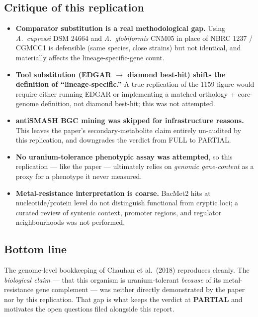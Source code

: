 \documentclass[11pt]{article}
\begin{document}
\subsection*{Critique of this replication}
\begin{itemize}
  \item \textbf{Comparator substitution is a real methodological gap.} Using \textit{A.\ cupressi} DSM 24664 and \textit{A.\ globiformis} CNM05 in place of NBRC 1237 / CGMCC1 is defensible (same species, close strains) but not identical, and materially affects the lineage-specific-gene count.
  \item \textbf{Tool substitution (EDGAR $\rightarrow$ diamond best-hit) shifts the definition of ``lineage-specific.''} A true replication of the 1159 figure would require either running EDGAR or implementing a matched orthology + core-genome definition, not diamond best-hit; this was not attempted.
  \item \textbf{antiSMASH BGC mining was skipped for infrastructure reasons.} This leaves the paper's secondary-metabolite claim entirely un-audited by this replication, and downgrades the verdict from FULL to PARTIAL.
  \item \textbf{No uranium-tolerance phenotypic assay was attempted}, so this replication --- like the paper --- ultimately relies on \emph{genomic gene-content} as a proxy for a phenotype it never measured.
  \item \textbf{Metal-resistance interpretation is coarse.} BacMet2 hits at nucleotide/protein level do not distinguish functional from cryptic loci; a curated review of syntenic context, promoter regions, and regulator neighbourhoods was not performed.
\end{itemize}

\subsection*{Bottom line}
The genome-level bookkeeping of Chauhan et al.\ (2018) reproduces cleanly. The \emph{biological claim} --- that this organism is uranium-tolerant \emph{because} of its metal-resistance gene complement --- was neither directly demonstrated by the paper nor by this replication. That gap is what keeps the verdict at \textbf{PARTIAL} and motivates the open questions filed alongside this report.
\end{document}
